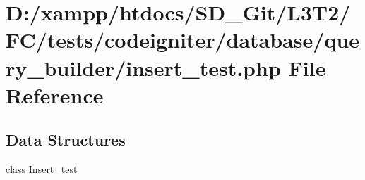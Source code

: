 \hypertarget{insert__test_8php}{}\section{D\+:/xampp/htdocs/\+S\+D\+\_\+\+Git/\+L3\+T2/\+F\+C/tests/codeigniter/database/query\+\_\+builder/insert\+\_\+test.php File Reference}
\label{insert__test_8php}
\subsection*{Data Structures}
\begin{DoxyCompactItemize}
\item 
class \hyperlink{class_insert__test}{Insert\+\_\+test}
\end{DoxyCompactItemize}
